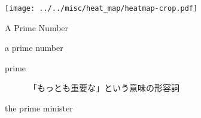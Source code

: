 \documentclass[aspectratio=169,xcolor={dvipsnames,table}]{beamer}
\begin{document}
\begin{frame}[plain]

\hspace*{-22pt}
\texttt{[image: ../../misc/heat\_map/heatmap-crop.pdf]}
\end{frame}

\begin{frame}[plain]{A Prime Number}
\Large
\pause

 a prime number

\pause
\begin{description}
 \item[prime] 「もっとも重要な」という意味の形容詞
\end{description}

\pause

\bigskip
\hfill{}the prime minister
\vfill
\hyperlink{today}{}

\end{frame}
\end{document}
